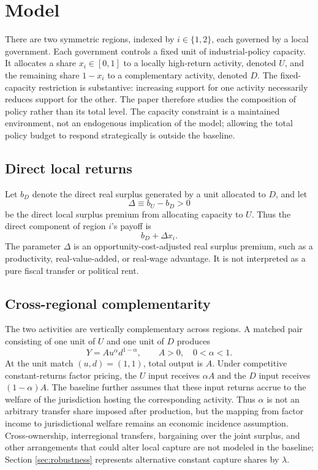 \section{Model}
\label{sec:model}

There are two symmetric regions, indexed by $i\in\{1,2\}$, each governed by a local government. Each government controls a fixed unit of industrial-policy capacity. It allocates a share $x_i\in[0,1]$ to a locally high-return activity, denoted $U$, and the remaining share $1-x_i$ to a complementary activity, denoted $D$. The fixed-capacity restriction is substantive: increasing support for one activity necessarily reduces support for the other. The paper therefore studies the composition of policy rather than its total level. The capacity constraint is a maintained environment, not an endogenous implication of the model; allowing the total policy budget to respond strategically is outside the baseline.

\subsection{Direct local returns}

Let $b_D$ denote the direct real surplus generated by a unit allocated to $D$, and let
\begin{equation}
\Delta\equiv b_U-b_D>0
\label{eq:delta}
\end{equation}
be the direct local surplus premium from allocating capacity to $U$. Thus the direct component of region $i$'s payoff is
\begin{equation}
b_D+\Delta x_i.
\label{eq:direct-return}
\end{equation}
The parameter $\Delta$ is an opportunity-cost-adjusted real surplus premium, such as a productivity, real-value-added, or real-wage advantage. It is not interpreted as a pure fiscal transfer or political rent.

\subsection{Cross-regional complementarity}

The two activities are vertically complementary across regions. A matched pair consisting of one unit of $U$ and one unit of $D$ produces
\begin{equation}
Y=A u^{\alpha}d^{1-\alpha},
\qquad A>0,\quad 0<\alpha<1.
\label{eq:production}
\end{equation}
At the unit match $(u,d)=(1,1)$, total output is $A$. Under competitive constant-returns factor pricing, the $U$ input receives $\alpha A$ and the $D$ input receives $(1-\alpha)A$. The baseline further assumes that these input returns accrue to the welfare of the jurisdiction hosting the corresponding activity. Thus $\alpha$ is not an arbitrary transfer share imposed after production, but the mapping from factor income to jurisdictional welfare remains an economic incidence assumption. Cross-ownership, interregional transfers, bargaining over the joint surplus, and other arrangements that could alter local capture are not modeled in the baseline; Section \ref{sec:robustness} represents alternative constant capture shares by $\lambda$.

